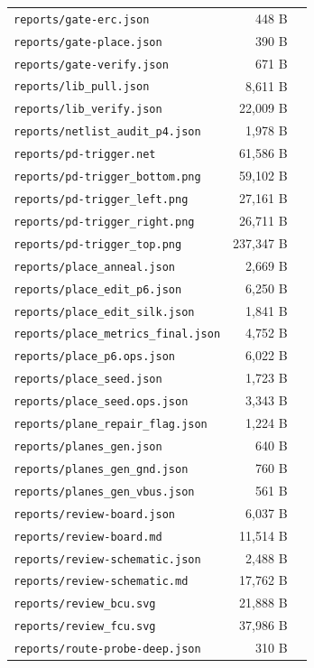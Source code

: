 \documentclass[11pt,a4paper]{article}
\begin{document}
{\begin{longtable}{p{9cm}rp{4cm}}
\texttt{reports/gate-erc.json} & 448 B &  \\
\texttt{reports/gate-place.json} & 390 B &  \\
\texttt{reports/gate-verify.json} & 671 B &  \\
\texttt{reports/lib\_pull.json} & 8,611 B &  \\
\texttt{reports/lib\_verify.json} & 22,009 B &  \\
\texttt{reports/netlist\_audit\_p4.json} & 1,978 B &  \\
\texttt{reports/pd-trigger.net} & 61,586 B &  \\
\texttt{reports/pd-trigger\_bottom.png} & 59,102 B &  \\
\texttt{reports/pd-trigger\_left.png} & 27,161 B &  \\
\texttt{reports/pd-trigger\_right.png} & 26,711 B &  \\
\texttt{reports/pd-trigger\_top.png} & 237,347 B &  \\
\texttt{reports/place\_anneal.json} & 2,669 B &  \\
\texttt{reports/place\_edit\_p6.json} & 6,250 B &  \\
\texttt{reports/place\_edit\_silk.json} & 1,841 B &  \\
\texttt{reports/place\_metrics\_final.json} & 4,752 B &  \\
\texttt{reports/place\_p6.ops.json} & 6,022 B &  \\
\texttt{reports/place\_seed.json} & 1,723 B &  \\
\texttt{reports/place\_seed.ops.json} & 3,343 B &  \\
\texttt{reports/plane\_repair\_flag.json} & 1,224 B &  \\
\texttt{reports/planes\_gen.json} & 640 B &  \\
\texttt{reports/planes\_gen\_gnd.json} & 760 B &  \\
\texttt{reports/planes\_gen\_vbus.json} & 561 B &  \\
\texttt{reports/review-board.json} & 6,037 B &  \\
\texttt{reports/review-board.md} & 11,514 B &  \\
\texttt{reports/review-schematic.json} & 2,488 B &  \\
\texttt{reports/review-schematic.md} & 17,762 B &  \\
\texttt{reports/review\_bcu.svg} & 21,888 B &  \\
\texttt{reports/review\_fcu.svg} & 37,986 B &  \\
\texttt{reports/route-probe-deep.json} & 310 B &  \\

\end{longtable}}
\end{document}
